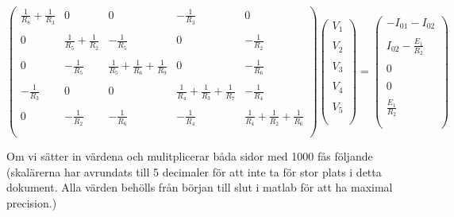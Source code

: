 \documentclass[a4paper]{article}
\begin{document}
\begin{equation*}
\begin{pmatrix}
\frac{1}{R_8} + \frac{1}{R_3} & 0 & 0 & -\frac{1}{R_3} & 0\\\\

0 & \frac{1}{R_5} + \frac{1}{R_2}  & -\frac{1}{R_5} & 0 & -\frac{1}{R_2}\\\\

0 & - \frac{1}{R_5} & \frac{1}{R_5} + \frac{1}{R_6} + \frac{1}{R_9} & 0 & -\frac{1}{R_6}\\\\

 -\frac{1}{R_3} & 0 & 0 & \frac{1}{R_4} + \frac{1}{R_3} + \frac{1}{R_7} & -\frac{1}{R_4}\\\\

0 & -\frac{1}{R_2} & -\frac{1}{R_6} & -\frac{1}{R_4} & \frac{1}{R_4} + \frac{1}{R_2} + \frac{1}{R_6}\\\\

\end{pmatrix}
 \begin{pmatrix}
    V_1\\\\
    V_2\\\\
    V_3\\\\
    V_4\\\\
    V_5\\\\
\end{pmatrix}
=
\begin{pmatrix}
    -I_{01} - I_{02}\\\\
    I_{02} - \frac{E_1}{R_2}\\\\
    0\\\\
    0\\\\
    \frac{E_1}{R_2}\\\\

\end{pmatrix}
\end{equation*}

Om vi sätter in värdena och mulitplicerar båda sidor med 1000 fås följande (skalärerna har avrundats till 5 decimaler för att inte ta för stor plats i detta dokument. Alla värden behölls från början till slut i matlab för att ha maximal precision.)
\end{document}
